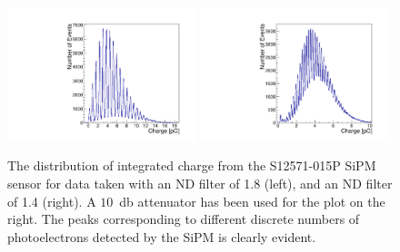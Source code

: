 \begin{figure}[htbp] 
\centering
\includegraphics[width=0.49\textwidth]{figures/NPhotons1.pdf} 
\includegraphics[width=0.49\textwidth]{figures/NPhotons2.pdf} 
\caption{The distribution of integrated charge from the S12571-015P SiPM sensor for data 
taken with an ND filter of 1.8 (left), and an ND filter of 1.4 (right). 
A $10$~db attenuator has been used for the plot on the right. The peaks corresponding
to different discrete numbers of photoelectrons detected by the SiPM is clearly
evident.} 
\label{fig:NPhotonPeaks} 
\end{figure} 

